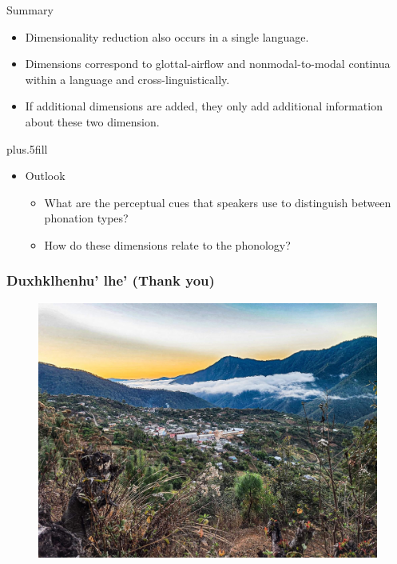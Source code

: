 \documentclass{beamer}
\begin{document}
\begin{frame}{Summary}

  \begin{itemize}
  \item Dimensionality reduction also occurs in a single language.
  \item Dimensions correspond to glottal-airflow and nonmodal-to-modal continua within a language and cross-linguistically.
  \item If additional dimensions are added, they only add additional information about these two dimension.
  \end{itemize}
  
  \vskip0pt plus.5fill
  \begin{itemize}
  \item
    Outlook
    \begin{itemize}
    \item What are the perceptual cues that speakers use to distinguish between phonation types?
    \item How do these dimensions relate to the phonology?
    \end{itemize}
  \end{itemize}
\end{frame}

\begin{frame}
  \frametitle{Duxhklhenhu' lhe' (Thank you)}
  \begin{figure}[h!]
    \centering
    \includegraphics[width = \linewidth]{images/SantiagoLaxopa.jpeg}
  \end{figure}
\end{frame}
\end{document}
